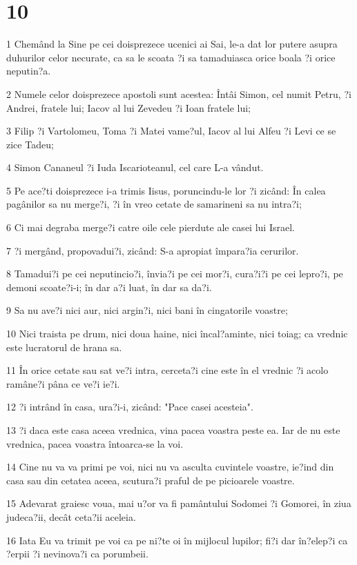\chapter{10}

\par 1 Chemând la Sine pe cei doisprezece ucenici ai Sai, le-a dat lor putere asupra duhurilor celor necurate, ca sa le scoata ?i sa tamaduiasca orice boala ?i orice neputin?a.
\par 2 Numele celor doisprezece apostoli sunt acestea: Întâi Simon, cel numit Petru, ?i Andrei, fratele lui; Iacov al lui Zevedeu ?i Ioan fratele lui;
\par 3 Filip ?i Vartolomeu, Toma ?i Matei vame?ul, Iacov al lui Alfeu ?i Levi ce se zice Tadeu;
\par 4 Simon Cananeul ?i Iuda Iscarioteanul, cel care L-a vândut.
\par 5 Pe ace?ti doisprezece i-a trimis Iisus, poruncindu-le lor ?i zicând: În calea pagânilor sa nu merge?i, ?i în vreo cetate de samarineni sa nu intra?i;
\par 6 Ci mai degraba merge?i catre oile cele pierdute ale casei lui Israel.
\par 7 ?i mergând, propovadui?i, zicând: S-a apropiat împara?ia cerurilor.
\par 8 Tamadui?i pe cei neputincio?i, învia?i pe cei mor?i, cura?i?i pe cei lepro?i, pe demoni scoate?i-i; în dar a?i luat, în dar sa da?i.
\par 9 Sa nu ave?i nici aur, nici argin?i, nici bani în cingatorile voastre;
\par 10 Nici traista pe drum, nici doua haine, nici încal?aminte, nici toiag; ca vrednic este lucratorul de hrana sa.
\par 11 În orice cetate sau sat ve?i intra, cerceta?i cine este în el vrednic ?i acolo ramâne?i pâna ce ve?i ie?i.
\par 12 ?i intrând în casa, ura?i-i, zicând: "Pace casei acesteia".
\par 13 ?i daca este casa aceea vrednica, vina pacea voastra peste ea. Iar de nu este vrednica, pacea voastra întoarca-se la voi.
\par 14 Cine nu va va primi pe voi, nici nu va asculta cuvintele voastre, ie?ind din casa sau din cetatea aceea, scutura?i praful de pe picioarele voastre.
\par 15 Adevarat graiesc voua, mai u?or va fi pamântului Sodomei ?i Gomorei, în ziua judeca?ii, decât ceta?ii aceleia.
\par 16 Iata Eu va trimit pe voi ca pe ni?te oi în mijlocul lupilor; fi?i dar în?elep?i ca ?erpii ?i nevinova?i ca porumbeii.
